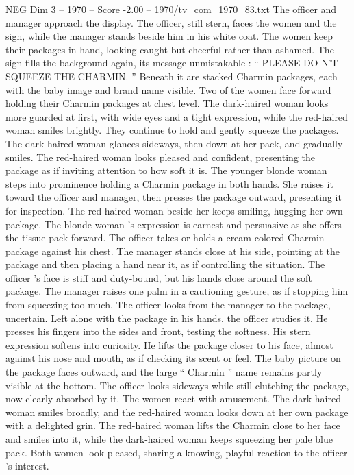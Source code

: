 \begin{textsample}{NEG Dim 3 – 1970 – Score -2.00 – 1970/tv\_com\_1970\_83.txt}
The officer and manager approach the display.
The officer, still stern, faces the women and the sign, while the manager stands beside him in his white coat.
The women keep their packages in hand, looking caught but cheerful rather than ashamed.
The sign fills the background again, its message unmistakable : “ PLEASE DO N’T SQUEEZE THE CHARMIN. ” Beneath it are stacked Charmin packages, each with the baby image and brand name visible.
Two of the women face forward holding their Charmin packages at chest level.
The dark-haired woman looks more guarded at first, with wide eyes and a tight expression, while the red-haired woman smiles brightly.
They continue to hold and gently squeeze the packages.
The dark-haired woman glances sideways, then down at her pack, and gradually smiles.
The red-haired woman looks pleased and confident, presenting the package as if inviting attention to how soft it is.
The younger blonde woman steps into prominence holding a Charmin package in both hands.
She raises it toward the officer and manager, then presses the package outward, presenting it for inspection.
The red-haired woman beside her keeps smiling, hugging her own package.
The blonde woman ’s expression is earnest and persuasive as she offers the tissue pack forward.
The officer takes or holds a cream-colored Charmin package against his chest.
The manager stands close at his side, pointing at the package and then placing a hand near it, as if controlling the situation.
The officer ’s face is stiff and duty-bound, but his hands close around the soft package.
The manager raises one palm in a cautioning gesture, as if stopping him from squeezing too much.
The officer looks from the manager to the package, uncertain.
Left alone with the package in his hands, the officer studies it.
He presses his fingers into the sides and front, testing the softness.
His stern expression softens into curiosity.
He lifts the package closer to his face, almost against his nose and mouth, as if checking its scent or feel.
The baby picture on the package faces outward, and the large “ Charmin ” name remains partly visible at the bottom.
The officer looks sideways while still clutching the package, now clearly absorbed by it.
The women react with amusement.
The dark-haired woman smiles broadly, and the red-haired woman looks down at her own package with a delighted grin.
The red-haired woman lifts the Charmin close to her face and smiles into it, while the dark-haired woman keeps squeezing her pale blue pack.
Both women look pleased, sharing a knowing, playful reaction to the officer ’s interest.

\end{textsample}
